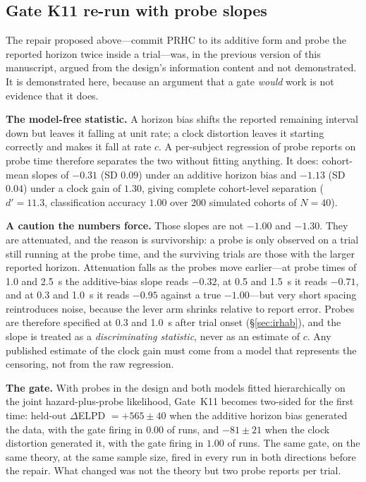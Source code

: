 \documentclass[9pt,twocolumn]{article}
\begin{document}
\subsection{Gate K11 re-run with probe slopes}
\label{sec:k11}
The repair proposed above---commit PRHC to its additive form and probe the reported horizon twice inside a trial---was, in the previous version of this manuscript, argued from the design's information content and not demonstrated. It is demonstrated here, because an argument that a gate \emph{would} work is not evidence that it does.

\textbf{The model-free statistic.} A horizon bias shifts the reported remaining interval down but leaves it falling at unit rate; a clock distortion leaves it starting correctly and makes it fall at rate $c$. A per-subject regression of probe reports on probe time therefore separates the two without fitting anything. It does: cohort-mean slopes of $-0.31$ (SD $0.09$) under an additive horizon bias and $-1.13$ (SD $0.04$) under a clock gain of $1.30$, giving complete cohort-level separation ($d'=11.3$, classification accuracy $1.00$ over 200 simulated cohorts of $N=40$).

\textbf{A caution the numbers force.} Those slopes are not $-1.00$ and $-1.30$. They are attenuated, and the reason is survivorship: a probe is only observed on a trial still running at the probe time, and the surviving trials are those with the larger reported horizon. Attenuation falls as the probes move earlier---at probe times of 1.0 and 2.5~s the additive-bias slope reads $-0.32$, at 0.5 and 1.5~s it reads $-0.71$, and at 0.3 and 1.0~s it reads $-0.95$ against a true $-1.00$---but very short spacing reintroduces noise, because the lever arm shrinks relative to report error. Probes are therefore specified at 0.3 and 1.0~s after trial onset (\S\ref{sec:irhab}), and the slope is treated as a \emph{discriminating statistic}, never as an estimate of $c$. Any published estimate of the clock gain must come from a model that represents the censoring, not from the raw regression.

\textbf{The gate.} With probes in the design and both models fitted hierarchically on the joint hazard-plus-probe likelihood, Gate~K11 becomes two-sided for the first time: held-out $\Delta$ELPD $=+565\pm40$ when the additive horizon bias generated the data, with the gate firing in $0.00$ of runs, and $-81\pm21$ when the clock distortion generated it, with the gate firing in $1.00$ of runs. The same gate, on the same theory, at the same sample size, fired in every run in both directions before the repair. What changed was not the theory but two probe reports per trial.
\end{document}
